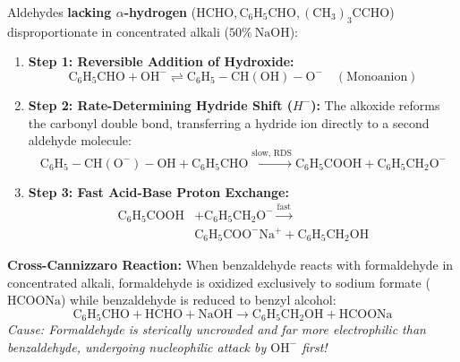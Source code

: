 \documentclass[10pt,twoside,openright]{book}
\begin{document}
\begin{formulabox}
Aldehydes \textbf{lacking $\alpha$-hydrogen} ($\mathrm{HCHO, C_6H_5CHO, (CH_3)_3CCHO}$) disproportionate in concentrated alkali ($50\%\ \mathrm{NaOH}$):
\begin{enumerate}[leftmargin=*]
  \item \textbf{Step 1: Reversible Addition of Hydroxide:}
  \begin{equation}
    \mathrm{C_6H_5CHO} + \mathrm{OH^-} \rightleftharpoons \mathrm{C_6H_5-CH(OH)-O^-} \quad (\text{Monoanion})
  \end{equation}
  \item \textbf{Step 2: Rate-Determining Hydride Shift ($H^-$):}
  The alkoxide reforms the carbonyl double bond, transferring a hydride ion directly to a second aldehyde molecule:
  \begin{equation}
    \mathrm{C_6H_5-CH(O^-)-OH} + \mathrm{C_6H_5CHO} \xrightarrow{\text{slow, RDS}} \mathrm{C_6H_5COOH} + \mathrm{C_6H_5CH_2O^-}
  \end{equation}
  \item \textbf{Step 3: Fast Acid-Base Proton Exchange:}
  \begin{align}
    \mathrm{C_6H_5COOH} &+ \mathrm{C_6H_5CH_2O^-} \xrightarrow{\text{fast}} \\
    &\mathbf{\mathrm{C_6H_5COO^-Na^+}} + \mathbf{\mathrm{C_6H_5CH_2OH}}
  \end{align}
\end{enumerate}
\textbf{Cross-Cannizzaro Reaction:} When benzaldehyde reacts with formaldehyde in concentrated alkali, formaldehyde is oxidized exclusively to sodium formate ($\mathrm{HCOONa}$) while benzaldehyde is reduced to benzyl alcohol:
\begin{equation}
  \mathrm{C_6H_5CHO} + \mathrm{HCHO} + \mathrm{NaOH} \longrightarrow \mathbf{\mathrm{C_6H_5CH_2OH}} + \mathbf{\mathrm{HCOONa}}
\end{equation}
\textit{Cause: Formaldehyde is sterically uncrowded and far more electrophilic than benzaldehyde, undergoing nucleophilic attack by $\mathrm{OH^-}$ first!}
\end{formulabox}
\end{document}
